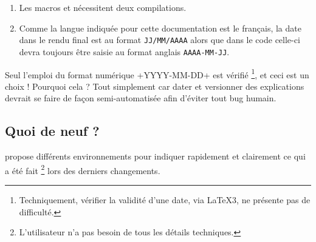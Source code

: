 \begin{tdocimportant}
    \leavevmode

    \begin{enumerate}
        \item Les macros  et  nécessitent deux compilations.

        \item Comme la langue indiquée pour cette documentation est le français, la date dans le rendu final est au format \texttt{JJ/MM/AAAA} alors que dans le code celle-ci devra toujours être saisie au format anglais \texttt{AAAA-MM-JJ}.
    \end{enumerate}
\end{tdocimportant}


\begin{tdocwarn}
    Seul l'emploi du format numérique \tdocinlatex+YYYY-MM-DD+ est vérifié
    \footnote{
        Techniquement, vérifier la validité d'une date, via \LaTeX3, ne présente pas de difficulté.
    },
    et ceci est un choix ! Pourquoi cela ? Tout simplement car dater et versionner des explications devrait se faire de façon semi-automatisée afin d'éviter tout bug humain.
\end{tdocwarn}


\subsection{Quoi de neuf ?}

 propose différents environnements pour indiquer rapidement et clairement ce qui a été fait
\footnote{
    L'utilisateur n'a pas besoin de tous les détails techniques.
}
lors des derniers changements.


\begin{tdocexa}
    \leavevmode

\end{tdocexa}




\begin{tdocexa}
    \leavevmode

\end{tdocexa}


